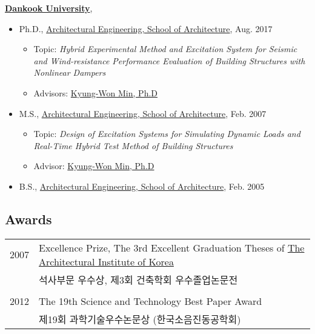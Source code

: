 \href{http://www.dankook.ac.kr/}{\textbf{Dankook University}},
\begin{itemize}
\item Ph.D.,
        \href{http://cms.dankook.ac.kr/web/archi}
             {Architectural Engineering, School of Architecture},
             Aug. 2017
        \begin{itemize}
        \item Topic: \emph{Hybrid Experimental Method and Excitation System for Seismic and Wind-resistance Performance Evaluation of Building Structures with Nonlinear Dampers}
        \item Advisors:
              \href{http://cms.dankook.ac.kr/web/archi/-16?p_p_id=DeptInfo_WAR_empInfoportlet&p_p_lifecycle=0&p_p_state=normal&p_p_mode=view&p_p_col_id=column-2&p_p_col_count=1&_DeptInfo_WAR_empInfoportlet_empId=2zEyEnhbhLlys2HRljBFWg%3D%3D&_DeptInfo_WAR_empInfoportlet_action=view_message}
                   {Kyung-Won Min, Ph.D}
        \end{itemize}

\item M.S.,
        \href{http://cms.dankook.ac.kr/web/archi}
             {Architectural Engineering, School of Architecture},
             Feb. 2007
        \begin{itemize}
        \item Topic: \emph{Design of Excitation Systems for Simulating Dynamic Loads and Real-Time Hybrid Test Method of Building Structures}
        \item Advisor:
              \href{http://cms.dankook.ac.kr/web/archi/-16?p_p_id=DeptInfo_WAR_empInfoportlet&p_p_lifecycle=0&p_p_state=normal&p_p_mode=view&p_p_col_id=column-2&p_p_col_count=1&_DeptInfo_WAR_empInfoportlet_empId=2zEyEnhbhLlys2HRljBFWg%3D%3D&_DeptInfo_WAR_empInfoportlet_action=view_message}
                   {Kyung-Won Min, Ph.D}
        \end{itemize}
\item[] B.S.,
        \href{http://cms.dankook.ac.kr/web/archi}
             {Architectural Engineering, School of Architecture},
             Feb. 2005
\end{itemize}


\subsection*{Awards}

\begin{tabularx}{\textwidth}{@{}XX@{}}
    2007 & Excellence Prize, The 3rd Excellent Graduation Theses of \href{http://www.aik.or.kr}{The Architectural Institute of Korea} \\
    & 석사부문 우수상, 제3회 건축학회 우수졸업논문전 \\
    \\
    2012 & The 19th Science and Technology Best Paper Award \\
    & 제19회 과학기술우수논문상 (한국소음진동공학회)
    \\
\end{tabularx}